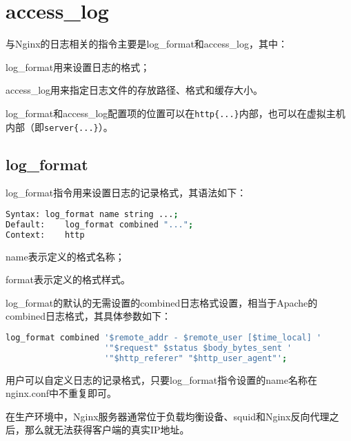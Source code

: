 \begin{lstlisting}[language=bash]

\end{lstlisting}


\section{access\_log}


与Nginx的日志相关的指令主要是log\_format和access\_log，其中：

\begin{compactitem}
\item log\_format用来设置日志的格式；
\item access\_log用来指定日志文件的存放路径、格式和缓存大小。
\end{compactitem}


log\_format和access\_log配置项的位置可以在\texttt{http\{...\}}内部，也可以在虚拟主机内部（即\texttt{server\{...\}}）。


\subsection{log\_format}


log\_format指令用来设置日志的记录格式，其语法如下：


\begin{lstlisting}[language=bash]
Syntax:	log_format name string ...;
Default:	log_format combined "...";
Context:	http
\end{lstlisting}


\begin{compactitem}
\item name表示定义的格式名称；
\item format表示定义的格式样式。
\end{compactitem}

log\_format的默认的无需设置的combined日志格式设置，相当于Apache的combined日志格式，其具体参数如下：



\begin{lstlisting}[language=bash]
log_format combined '$remote_addr - $remote_user [$time_local] '
                    '"$request" $status $body_bytes_sent '
                    '"$http_referer" "$http_user_agent"';
\end{lstlisting}


用户可以自定义日志的记录格式，只要log\_format指令设置的name名称在nginx.conf中不重复即可。

在生产环境中，Nginx服务器通常位于负载均衡设备、squid和Nginx反向代理之后，那么就无法获得客户端的真实IP地址。

